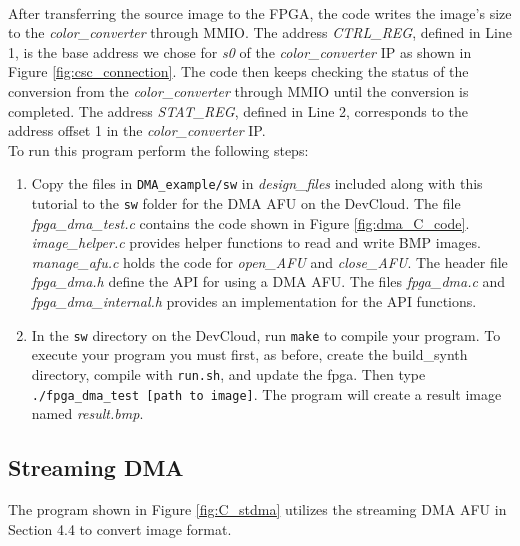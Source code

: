 \documentclass[11pt, twoside, pdftex]{article}
\begin{document}
 \\
 After transferring the source image to the FPGA, the code writes the image's size to the \emph{color\_converter} through MMIO. The address \emph{CTRL\_REG}, defined in Line 1, is the base address we chose for \emph{s0} of the \emph{color\_converter} IP as shown in Figure \ref{fig:csc_connection}. The code then keeps checking the status of the conversion from the \emph{color\_converter} through MMIO until the conversion is completed. The address \emph{STAT\_REG}, defined in Line 2, corresponds to the address offset 1 in the \emph{color\_converter} IP.\\



\noindent
To run this program perform the following steps:
\begin{enumerate}
    \item Copy the files in \texttt{DMA\_example/sw} in \emph{design\_files} included along with this tutorial to the \texttt{sw} folder for the DMA AFU on the DevCloud. The file \emph{fpga\_dma\_test.c} contains the code shown in Figure \ref{fig:dma_C_code}. \emph{image\_helper.c} provides helper functions to read and write BMP images. \emph{manage\_afu.c} holds the code for \emph{open\_AFU} and \emph{close\_AFU}. The header file \emph{fpga\_dma.h} define the API for using a DMA AFU. The files \emph{fpga\_dma.c} and \emph{fpga\_dma\_internal.h} provides an implementation for the API functions.
    
    \item In the \texttt{sw} directory on the DevCloud, run \verb|make| to compile your program. To execute your program you must first, as before, create the build\_synth directory, compile with \texttt{run.sh}, and update the fpga. Then type \verb|./fpga_dma_test [path to image]|. The program will create a result image named \emph{result.bmp}.
\end{enumerate}

 
 \subsection{Streaming DMA}
 The program shown in Figure \ref{fig:C_stdma} utilizes the streaming DMA AFU in Section 4.4 to convert image format.\\
 
\end{document}
